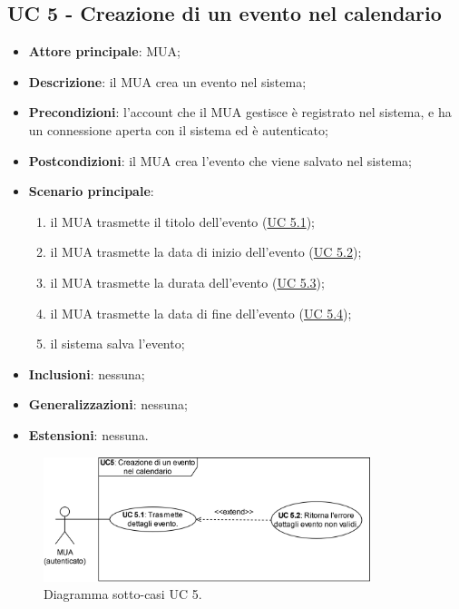 \subsection{UC 5 - Creazione di un evento nel calendario} \label{sec:UC5}
    \begin{itemize}
        \item \textbf{Attore principale}: MUA;
        \item \textbf{Descrizione}: il MUA crea un evento nel sistema;
        \item \textbf{Precondizioni}: l’account che il MUA gestisce è registrato nel sistema, e ha un connessione aperta con il sistema ed è autenticato;
        \item \textbf{Postcondizioni}: il MUA crea l'evento che viene salvato nel sistema;
        \item \textbf{Scenario principale}:
            \begin{enumerate}
                \item il MUA trasmette il titolo dell'evento (\hyperref[sec:UC5.1]{UC 5.1});
                \item il MUA trasmette la data di inizio dell'evento (\hyperref[sec:UC5.2]{UC 5.2});
                \item il MUA trasmette la durata dell'evento (\hyperref[sec:UC5.3]{UC 5.3});
                \item il MUA trasmette la data di fine dell'evento (\hyperref[sec:UC5.4]{UC 5.4});
                \item il sistema salva l'evento;
            \end{enumerate}
        \item \textbf{Inclusioni}: nessuna;
        \item \textbf{Generalizzazioni}: nessuna;
        \item \textbf{Estensioni}: nessuna.
    \end{itemize}

\begin{figure}[h]
    \includegraphics[width=0.85\textwidth]{sections/uc_imgs/UC05.X.png}
    \centering
    \caption{Diagramma sotto-casi UC 5.}
\end{figure}


